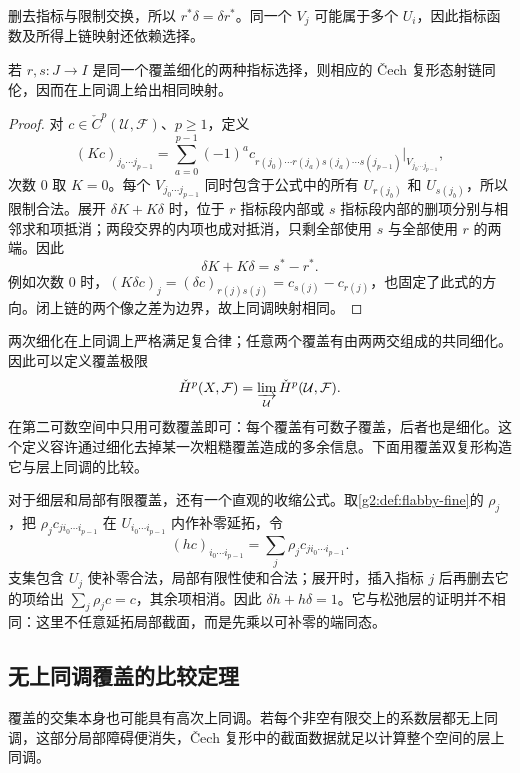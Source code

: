删去指标与限制交换，所以 \(r^*\delta=\delta r^*\)。同一个 \(V_j\) 可能属于多个 \(U_i\)，因此指标函数及所得上链映射还依赖选择。

\begin{proposition}\label{g2:prop:cech-refinement-homotopy}
	若 \(r,s:J\to I\) 是同一个覆盖细化的两种指标选择，则相应的 Čech 复形态射链同伦，因而在上同调上给出相同映射。
\end{proposition}
\begin{proof}
	对 \(c\in\check C^p(\mathcal U,\mathcal F)\)、\(p\ge1\)，定义
	\[
		(Kc)_{j_0\cdots j_{p-1}}
		=\sum_{a=0}^{p-1}(-1)^a c_{r(j_0)\cdots r(j_a)s(j_a)\cdots s(j_{p-1})}|_{V_{j_0\cdots j_{p-1}}},
	\]
	次数 \(0\) 取 \(K=0\)。每个 \(V_{j_0\cdots j_{p-1}}\) 同时包含于公式中的所有 \(U_{r(j_b)}\) 和 \(U_{s(j_b)}\)，所以限制合法。展开 \(\delta K+K\delta\) 时，位于 \(r\) 指标段内部或 \(s\) 指标段内部的删项分别与相邻求和项抵消；两段交界的内项也成对抵消，只剩全部使用 \(s\) 与全部使用 \(r\) 的两端。因此
	\[
		\delta K+K\delta=s^*-r^*.
	\]
	例如次数 \(0\) 时，\((K\delta c)_j=(\delta c)_{r(j)s(j)}=c_{s(j)}-c_{r(j)}\)，也固定了此式的方向。闭上链的两个像之差为边界，故上同调映射相同。
\end{proof}

两次细化在上同调上严格满足复合律；任意两个覆盖有由两两交组成的共同细化。因此可以定义覆盖极限
\[
	\check H^p(X,\mathcal F)=\varinjlim_{\mathcal U}\check H^p(\mathcal U,\mathcal F).
\]
在第二可数空间中只用可数覆盖即可：每个覆盖有可数子覆盖，后者也是细化。这个定义容许通过细化去掉某一次粗糙覆盖造成的多余信息。下面用覆盖双复形构造它与层上同调的比较。

对于细层和局部有限覆盖，还有一个直观的收缩公式。取\cref{g2:def:flabby-fine}的 \(\rho_j\)，把 \(\rho_jc_{j i_0\cdots i_{p-1}}\) 在 \(U_{i_0\cdots i_{p-1}}\) 内作补零延拓，令
\[
	(hc)_{i_0\cdots i_{p-1}}=\sum_j\rho_jc_{j i_0\cdots i_{p-1}}.
\]
支集包含 \(U_j\) 使补零合法，局部有限性使和合法；展开时，插入指标 \(j\) 后再删去它的项给出 \(\sum_j\rho_jc=c\)，其余项相消。因此 \(\delta h+h\delta=1\)。它与松弛层的证明并不相同：这里不任意延拓局部截面，而是先乘以可补零的端同态。

\subsection{无上同调覆盖的比较定理}
\label{g2:subsec:0702:04}
覆盖的交集本身也可能具有高次上同调。若每个非空有限交上的系数层都无上同调，这部分局部障碍便消失，Čech 复形中的截面数据就足以计算整个空间的层上同调。

